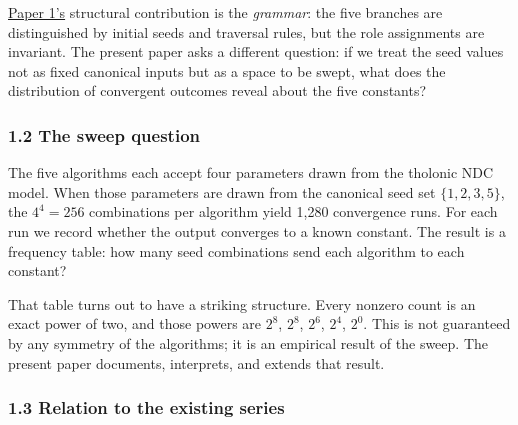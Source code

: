 \documentclass[
  11pt,
  letterpaper,
]{article}
\begin{document}
\href{https://github.com/baardev/truevalue/blob/main/docnav/Research/papers/1_recursive-tholonic-five-constants/1_recursive-tholonic-five-constants.pdf}{Paper
1's} structural contribution is the \emph{grammar}: the five branches
are distinguished by initial seeds and traversal rules, but the role
assignments are invariant. The present paper asks a different question:
if we treat the seed values not as fixed canonical inputs but as a space
to be swept, what does the distribution of convergent outcomes reveal
about the five constants?

\subsubsection{1.2 The sweep question}\label{the-sweep-question}

The five algorithms each accept four parameters drawn from the tholonic
NDC model. When those parameters are drawn from the canonical seed set
\(\{1, 2, 3, 5\}\), the \(4^4 = 256\) combinations per algorithm yield
1,280 convergence runs. For each run we record whether the output
converges to a known constant. The result is a frequency table: how many
seed combinations send each algorithm to each constant?

That table turns out to have a striking structure. Every nonzero count
is an exact power of two, and those powers are \(2^8\), \(2^8\),
\(2^6\), \(2^4\), \(2^0\). This is not guaranteed by any symmetry of the
algorithms; it is an empirical result of the sweep. The present paper
documents, interprets, and extends that result.

\subsubsection{1.3 Relation to the existing
series}\label{relation-to-the-existing-series}
\end{document}
